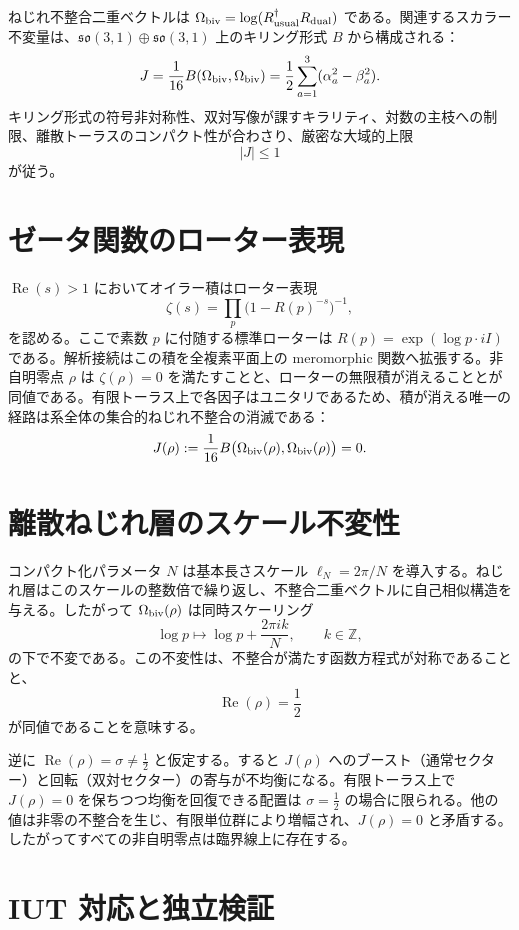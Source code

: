 \documentclass[a4paper]{article}
\begin{document}
ねじれ不整合二重ベクトルは $\Omega_{\rm biv}=\log(R_{\rm usual}^\dagger R_{\rm dual})$ である。関連するスカラー不変量は、$\mathfrak{so}(3,1)\oplus\mathfrak{so}(3,1)$ 上のキリング形式 $B$ から構成される：
\[
J=\frac{1}{16}B(\Omega_{\rm biv},\Omega_{\rm biv})=\frac12\sum_{a=1}^3(\alpha_a^2-\beta_a^2).
\]
キリング形式の符号非対称性、双対写像が課すキラリティ、対数の主枝への制限、離散トーラスのコンパクト性が合わさり、厳密な大域的上限
\[
|J|\le 1
\]
が従う。

\section{ゼータ関数のローター表現}

$\operatorname{Re}(s)>1$ においてオイラー積はローター表現
\[
\zeta(s)=\prod_p\bigl(1-R(p)^{-s}\bigr)^{-1},
\]
を認める。ここで素数 $p$ に付随する標準ローターは $R(p)=\exp(\log p\cdot iI)$ である。解析接続はこの積を全複素平面上の meromorphic 関数へ拡張する。非自明零点 $\rho$ は $\zeta(\rho)=0$ を満たすことと、ローターの無限積が消えることとが同値である。有限トーラス上で各因子はユニタリであるため、積が消える唯一の経路は系全体の集合的ねじれ不整合の消滅である：
\[
J(\rho):=\frac{1}{16}B\bigl(\Omega_{\rm biv}(\rho),\Omega_{\rm biv}(\rho)\bigr)=0.
\]

\section{離散ねじれ層のスケール不変性}

コンパクト化パラメータ $N$ は基本長さスケール $\ell_N=2\pi/N$ を導入する。ねじれ層はこのスケールの整数倍で繰り返し、不整合二重ベクトルに自己相似構造を与える。したがって $\Omega_{\rm biv}(\rho)$ は同時スケーリング
\[
\log p\mapsto\log p+\frac{2\pi i k}{N},\qquad k\in\mathbb{Z},
\]
の下で不変である。この不変性は、不整合が満たす函数方程式が対称であることと、
\[
\operatorname{Re}(\rho)=\frac12
\]
が同値であることを意味する。

逆に $\operatorname{Re}(\rho)=\sigma\neq\frac12$ と仮定する。すると $J(\rho)$ へのブースト（通常セクター）と回転（双対セクター）の寄与が不均衡になる。有限トーラス上で $J(\rho)=0$ を保ちつつ均衡を回復できる配置は $\sigma=\frac12$ の場合に限られる。他の値は非零の不整合を生じ、有限単位群により増幅され、$J(\rho)=0$ と矛盾する。したがってすべての非自明零点は臨界線上に存在する。

\section{IUT 対応と独立検証}
\end{document}
